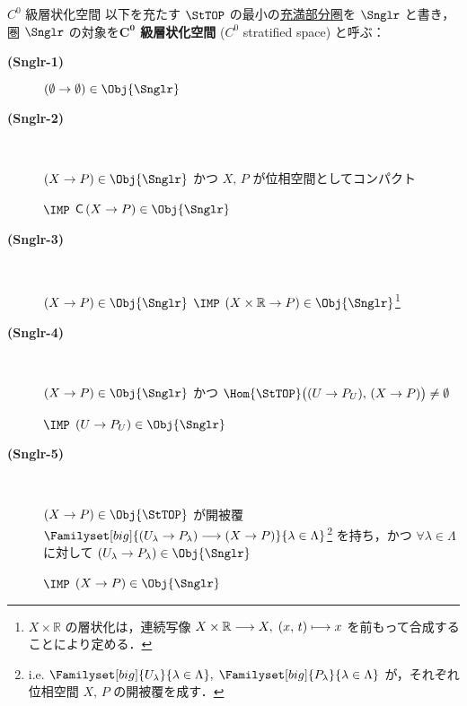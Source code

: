 \documentclass[TQFT_main]{subfiles}
\begin{document}
\begin{mydef}[label=def:Snglr-C0]{$C^0$ 級層状化空間}
    以下を充たす $\StTOP$ の最小の\hyperref[def:faithful]{充満部分圏}を $\Snglr$ と書き，圏 $\Snglr$ の対象を\textbf{$\bm{C^0}$ 級層状化空間} ($C^0$ stratified space) と呼ぶ：
    \begin{description}
        \item[\textbf{(Snglr-1)}] $(\emptyset \to \emptyset) \in \Obj{\Snglr}$
        \item[\textbf{(Snglr-2)}]　
        
        $(X \to P) \in \Obj{\Snglr}$ かつ $X,\, P$ が位相空間としてコンパクト 
        
        $\IMP$ $\Cone{X \to P} \in \Obj{\Snglr}$
        
        \item[\textbf{(Snglr-3)}]　
        
        $(X \to P) \in \Obj{\Snglr}$ $\IMP$ $(X \times \mathbb{R} \to P) \in \Obj{\Snglr}$\footnote{$X \times \mathbb{R}$ の層状化は，連続写像 $X \times \mathbb{R} \longrightarrow X,\; (x,\, t) \longmapsto x$ を前もって合成することにより定める．}
        
        \item[\textbf{(Snglr-4)}]　
        
        $(X \to P) \in \Obj{\Snglr}$ かつ $\Hom{\StTOP} \bigl( (U \to P_U),\, (X \to P) \bigr) \neq \emptyset$ 
        
        $\IMP$ $(U \to P_U) \in \Obj{\Snglr}$
        
        \item[\textbf{(Snglr-5)}]　 
        
        $(X \to P) \in \Obj{\StTOP}$ が開被覆 $\Familyset[big]{(U_\lambda \to P_\lambda) \lto (X \to P)}{\lambda \in \Lambda}$\footnote{i.e. $\Familyset[big]{U_\lambda}{\lambda \in \Lambda},\; \Familyset[big]{P_\lambda}{\lambda \in \Lambda}$ が，それぞれ位相空間 $X,\, P$ の開被覆を成す．} を持ち，かつ $\forall \lambda \in \Lambda$ に対して $(U_\lambda \to P_\lambda) \in \Obj{\Snglr}$ 
        
        $\IMP$ $(X \to P) \in \Obj{\Snglr}$
    \end{description}
\end{mydef}
\end{document}
